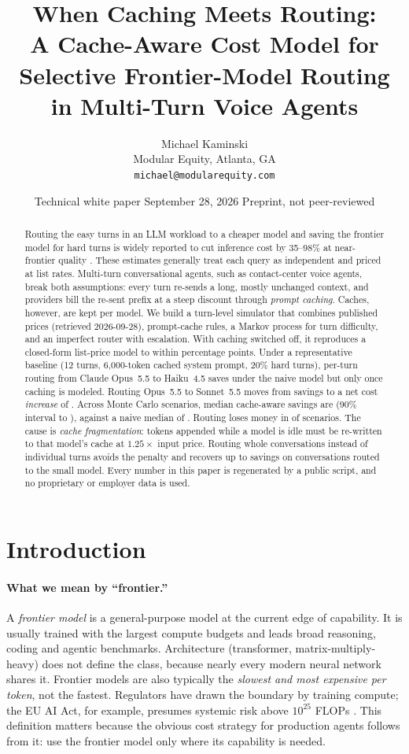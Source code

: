 \documentclass[10pt]{article}
\title{\textbf{When Caching Meets Routing:}\\A Cache-Aware Cost Model for Selective Frontier-Model Routing in Multi-Turn Voice Agents}
\author{Michael Kaminski\\\small Modular Equity, Atlanta, GA\\\small\texttt{michael@modularequity.com}}
\date{Technical white paper \quad\textperiodcentered\quad September 28, 2026 \quad\textperiodcentered\quad Preprint, not peer-reviewed}
\begin{document}
\maketitle

\begin{abstract}
\noindent Routing the easy turns in an LLM workload to a cheaper model and saving the frontier model for hard turns is widely reported to cut inference cost by 35--98\% at near-frontier quality \cite{chen2023frugalgpt,ong2024routellm,ding2024hybrid}. These estimates generally treat each query as independent and priced at list rates. Multi-turn conversational agents, such as contact-center voice agents, break both assumptions: every turn re-sends a long, mostly unchanged context, and providers bill the re-sent prefix at a steep discount through \emph{prompt caching}. Caches, however, are kept per model. We build a turn-level simulator that combines published prices (retrieved 2026-09-28), prompt-cache rules, a Markov process for turn difficulty, and an imperfect router with escalation. With caching switched off, it reproduces a closed-form list-price model to within \valGap{} percentage points. Under a representative baseline (12 turns, 6{,}000-token cached system prompt, 20\% hard turns), per-turn routing from Claude Opus~5.5 to Haiku~4.5 saves \hNaive{} under the naive model but only \hCache{} once caching is modeled. Routing Opus~5.5 to Sonnet~5.5 moves from \sNaive{} savings to a net cost \emph{increase} of \sCache{}. Across \mcN{} Monte Carlo scenarios, median cache-aware savings are \mcMed{} (90\% interval \mcFive{} to \mcNinetyFive{}), against a naive median of \mcNaive{}. Routing loses money in \mcNeg{} of scenarios. The cause is \emph{cache fragmentation}: tokens appended while a model is idle must be re-written to that model's cache at $1.25\times$ input price. Routing whole conversations instead of individual turns avoids the penalty and recovers up to \allHaiku{} savings on conversations routed to the small model. Every number in this paper is regenerated by a public script, and no proprietary or employer data is used.
\end{abstract}

\section{Introduction}
\paragraph{What we mean by ``frontier.''} A \emph{frontier model} is a general-purpose model at the current edge of capability. It is usually trained with the largest compute budgets and leads broad reasoning, coding and agentic benchmarks. Architecture (transformer, matrix-multiply-heavy) does not define the class, because nearly every modern neural network shares it. Frontier models are also typically the \emph{slowest and most expensive per token}, not the fastest. Regulators have drawn the boundary by training compute; the EU AI Act, for example, presumes systemic risk above $10^{25}$ FLOPs \cite{euaiact}. This definition matters because the obvious cost strategy for production agents follows from it: use the frontier model only where its capability is needed.
\end{document}
